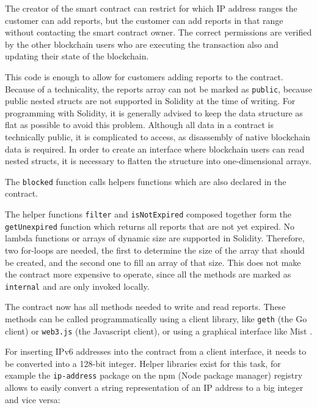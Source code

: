 The creator of the smart contract can restrict for which IP address ranges the customer can add reports, but the customer can add reports in that range without contacting the smart contract owner. The correct permissions are verified by the other blockchain users who are executing the transaction also and updating their state of the blockchain.

This code is enough to allow for customers adding reports to the contract. Because of a technicality, the reports array can not be marked as \texttt{public}, because public nested structs are not supported in Solidity at the time of writing. For programming with Solidity, it is generally advised to keep the data structure as flat as possible to avoid this problem.
Although all data in a contract is technically public, it is complicated to access, as disassembly of native blockchain data is required. In order to create an interface where blockchain users can read nested structs, it is necessary to flatten the structure into one-dimensional arrays.



The \texttt{blocked} function calls helpers functions which are also declared in the contract.



The helper functions \texttt{filter} and \texttt{isNotExpired} composed together form the \texttt{getUnexpired} function which returns all reports that are not yet expired. No lambda functions or arrays of dynamic size are supported in Solidity. Therefore, two for-loops are needed, the first to determine the size of the array that should be created, and the second one to fill an array of that size. This does not make the contract more expensive to operate, since all the methods are marked as \texttt{internal} and are only invoked locally.

The contract now has all methods needed to write and read reports. These methods can be called programmatically using a client library, like \texttt{geth} (the Go client) or \texttt{web3.js} (the Javascript client), or using a graphical interface like Mist \cite{Mist}.

For inserting IPv6 addresses into the contract from a client interface, it needs to be converted into a 128-bit integer. Helper libraries exist for this task, for example the \texttt{ip-address} package on the npm (Node package manager) registry \cite{IpAddressNpm} allows to easily convert a string representation of an IP address to a big integer and vice versa:


